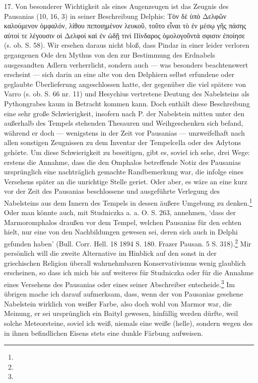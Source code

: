 \documentclass[a4paper, 11pt, oneside]{article}
\begin{document}
17. Von besonderer Wichtigkeit als eines Augenzeugen ist das Zeugnis des Pausanias (10, 16, 3) in seiner Beschreibung Delphis: Τὸν δὲ ὑπὸ Δελφῶν καλούμενον ὀμφαλόν, λίθου πεποιημένον λευκοῦ, τοῦτο εἶναι τὸ ἐν μέσῳ γῆς πάσης αὐτοί τε λέγουσιν οἱ Δελφοί καὶ ἐν ὠδῇ τινὶ Πίνδαρος ὁμολογοῦντά σφισιν ἐποίησε (s. ob. S. 58). Wir ersehen daraus nicht bloß, dass Pindar in einer leider verloren gegangenen Ode den Mythus von den zur Bestimmung des Erdnabels ausgesandten Adlern verherrlicht, sondern auch --- was besonders beachtenswert erscheint --- sich darin an eine alte von den Delphiern selbst erfundene oder geglaubte Überlieferung angeschlossen hatte, der gegenüber die viel spätere von Varro (s. ob. S. 66 nr. 11) und Hesychius vertretene Deutung des Nabelsteins als Pythongrabes kaum in Betracht kommen kann. Doch enthält diese Beschreibung eine sehr große Schwierigkeit, insofern nach P. der Nabelstein mitten unter den außerhalb des Tempels stehenden Thesauren und Weihgeschenken sich befand, während er doch --- wenigstens in der Zeit vor Pausanias --- unzweifelhaft nach allen sonstigen Zeugnissen zu dem Inventar der Tempelcella oder des Adytons gehörte. Um diese Schwierigkeit zu beseitigen, gibt es, soviel ich sehe, drei Wege: erstens die Annahme, dass die den Omphalos betreffende Notiz des Pausanias ursprünglich eine nachträglich gemachte Randbemerkung war, die infolge eines Versehens später an die unrichtige Stelle geriet. Oder aber, es wäre an eine kurz vor der Zeit des Pausanias beschlossene und ausgeführte Verlegung des Nabelsteins aus dem Innern des Tempels in dessen äußere Umgebung zu denken.\footnote{} Oder man könnte auch, mit Studniczka a. a. O. S. 263, annehmen, `dass der Marmoromphalos draußen vor dem Tempel, welchen Pausanias für den echten hielt, nur eine von den Nachbildungen gewesen sei, deren sich auch in Delphi gefunden haben' (Bull. Corr. Hell. 18 1894 S. 180. Frazer Pausan. 5 S. 318).\footnote{} Mir persönlich will die zweite Alternative im Hinblick auf den sonst in der griechischen Religion überall wahrnehmbaren Konservativismus wenig glaublich erscheinen, so dass ich mich bis auf weiteres für Studniczka oder für die Annahme eines Versehens des Pausanias oder eines seiner Abschreiber entscheide.\footnote{} Im übrigen mache ich darauf aufmerksam, dass, wenn der von Pausanias gesehene Nabelstein wirklich von weißer Farbe, also doch wohl von Marmor war, die Meinung, er sei ursprünglich ein Baityl gewesen, hinfällig werden dürfte, weil solche Meteorsteine, soviel ich weiß, niemals eine weiße (helle), sondern wegen des in ihnen befindlichen Eisens stets eine dunkle Färbung aufweisen.
\end{document}
